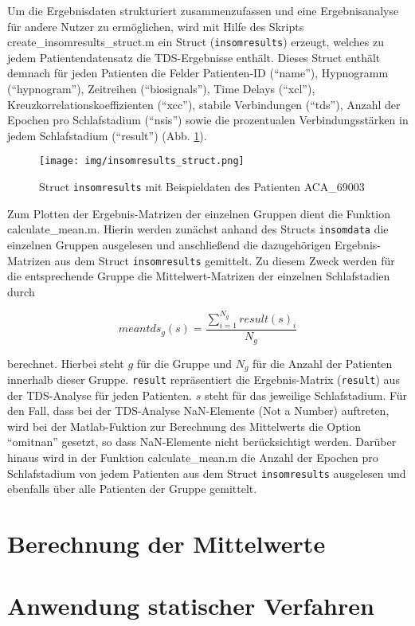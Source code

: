 Um die Ergebnisdaten strukturiert zusammenzufassen und eine Ergebnisanalyse für andere Nutzer zu ermöglichen, wird mit Hilfe des Skripts create\_insomresults\_struct.m ein Struct (\texttt{insomresults}) erzeugt, welches zu jedem Patientendatensatz die \acs{TDS}-Ergebnisse enthält. Dieses Struct enthält demnach für jeden Patienten die Felder Patienten-ID ("`name"'), Hypnogramm ("`hypnogram"'), Zeitreihen ("`biosignals"'), Time Delays ("`xcl"'), Kreuzkorrelationskoeffizienten ("`xcc"'), stabile Verbindungen ("`tds"'), Anzahl der Epochen pro Schlafstadium ("`nsis"') sowie die prozentualen Verbindungsstärken in jedem Schlafstadium ("`result"') (Abb. \ref{fig:resultstruct}).

\begin{figure}[H]
	\centering
	\texttt{[image: img/insomresults\_struct.png]}
	\caption[Struct \texttt{insomresults} mit Beispieldaten]{Struct \texttt{insomresults} mit Beispieldaten des Patienten ACA\_69003}
	\label{fig:resultstruct}
\end{figure}

Zum Plotten der Ergebnis-Matrizen der einzelnen Gruppen dient die Funktion calculate\_mean.m. Hierin werden zunächst anhand des Structs \texttt{insomdata} die einzelnen Gruppen ausgelesen und anschließend die dazugehörigen Ergebnis-Matrizen aus dem Struct \texttt{insomresults} gemittelt. Zu diesem Zweck werden für die entsprechende Gruppe die Mittelwert-Matrizen der einzelnen Schlafstadien durch

\begin{equation}
meantds_g(s) = \frac{\sum \limits_{i=1}^{N_g} result(s)_i}{N_g}
	\label{eq:mean}
\end{equation}

berechnet. Hierbei steht $g$ für die Gruppe und $N_g$ für die Anzahl der Patienten innerhalb dieser Gruppe. \texttt{result} repräsentiert die Ergebnis-Matrix (\texttt{result}) aus der \acs{TDS}-Analyse für jeden Patienten. $s$ steht für das jeweilige Schlafstadium. Für den Fall, dass bei der \acs{TDS}-Analyse NaN-Elemente (Not a Number) auftreten, wird bei der Matlab-Fuktion zur Berechnung des Mittelwerts die Option "`omitnan"' gesetzt, so dass NaN-Elemente nicht berücksichtigt werden. Darüber hinaus wird in der Funktion calculate\_mean.m die Anzahl der Epochen pro Schlafstadium von jedem Patienten aus dem Struct \texttt{insomresults} ausgelesen und ebenfalls über alle Patienten der Gruppe gemittelt.

\section{Berechnung der Mittelwerte}

\section{Anwendung statischer Verfahren}